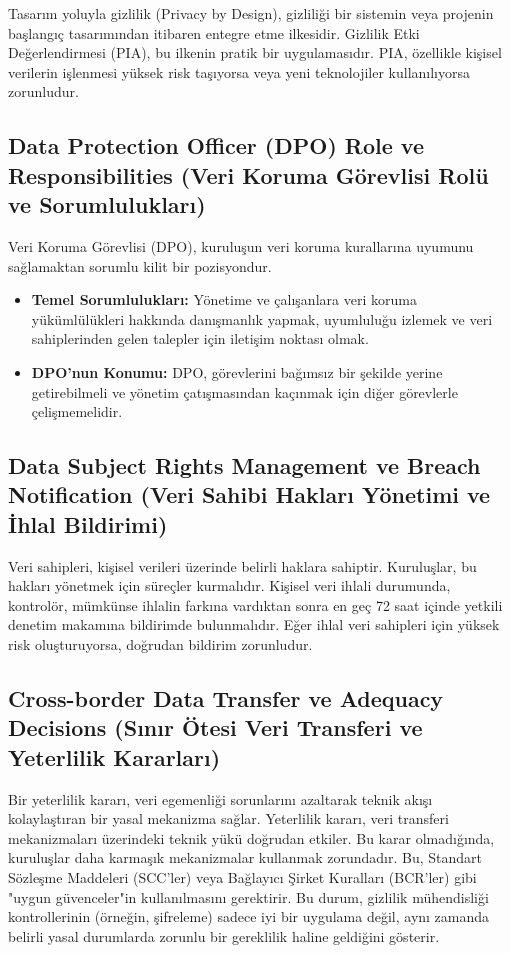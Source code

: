 Tasarım yoluyla gizlilik (Privacy by Design), gizliliği bir sistemin veya projenin başlangıç tasarımından itibaren entegre etme ilkesidir. Gizlilik Etki Değerlendirmesi (PIA), bu ilkenin pratik bir uygulamasıdır. PIA, özellikle kişisel verilerin işlenmesi yüksek risk taşıyorsa veya yeni teknolojiler kullanılıyorsa zorunludur.

\subsection{Data Protection Officer (DPO) Role ve Responsibilities (Veri Koruma Görevlisi Rolü ve Sorumlulukları)}

Veri Koruma Görevlisi (DPO), kuruluşun veri koruma kurallarına uyumunu sağlamaktan sorumlu kilit bir pozisyondur.
\begin{itemize}
    \item \textbf{Temel Sorumlulukları:} Yönetime ve çalışanlara veri koruma yükümlülükleri hakkında danışmanlık yapmak, uyumluluğu izlemek ve veri sahiplerinden gelen talepler için iletişim noktası olmak.
    \item \textbf{DPO'nun Konumu:} DPO, görevlerini bağımsız bir şekilde yerine getirebilmeli ve yönetim çatışmasından kaçınmak için diğer görevlerle çelişmemelidir.
\end{itemize}

\subsection{Data Subject Rights Management ve Breach Notification (Veri Sahibi Hakları Yönetimi ve İhlal Bildirimi)}

Veri sahipleri, kişisel verileri üzerinde belirli haklara sahiptir. Kuruluşlar, bu hakları yönetmek için süreçler kurmalıdır. Kişisel veri ihlali durumunda, kontrolör, mümkünse ihlalin farkına vardıktan sonra en geç 72 saat içinde yetkili denetim makamına bildirimde bulunmalıdır. Eğer ihlal veri sahipleri için yüksek risk oluşturuyorsa, doğrudan bildirim zorunludur.

\subsection{Cross-border Data Transfer ve Adequacy Decisions (Sınır Ötesi Veri Transferi ve Yeterlilik Kararları)}

Bir yeterlilik kararı, veri egemenliği sorunlarını azaltarak teknik akışı kolaylaştıran bir yasal mekanizma sağlar. Yeterlilik kararı, veri transferi mekanizmaları üzerindeki teknik yükü doğrudan etkiler. Bu karar olmadığında, kuruluşlar daha karmaşık mekanizmalar kullanmak zorundadır. Bu, Standart Sözleşme Maddeleri (SCC'ler) veya Bağlayıcı Şirket Kuralları (BCR'ler) gibi "uygun güvenceler"in kullanılmasını gerektirir. Bu durum, gizlilik mühendisliği kontrollerinin (örneğin, şifreleme) sadece iyi bir uygulama değil, aynı zamanda belirli yasal durumlarda zorunlu bir gereklilik haline geldiğini gösterir.


